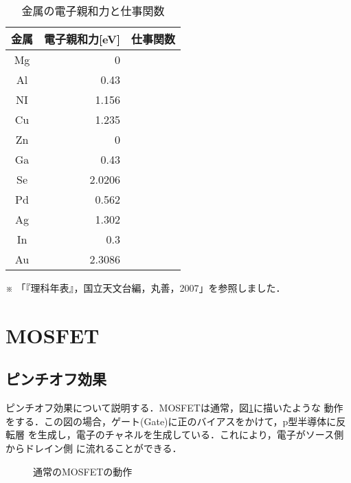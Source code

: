         \begin{table}[htbp]
            \caption{金属の電子親和力と仕事関数} \label{densin_sgotokansu}
            \begin{center}
                \begin{tabular}{|c|r|l|} \hline
                    金属 & \multicolumn{1}{c|}{電子親和力[eV]} & \multicolumn{1}{c|}{仕事関数} \\ \hline
                    Mg & 0\phantom{.}\phantom{0000} &  \\ \hline
                    Al & 0.43\phantom{00} &  \\ \hline
                    NI & 1.156\phantom{0} &  \\ \hline
                    Cu & 1.235\phantom{0} &  \\ \hline
                    Zn & 0\phantom{.}\phantom{0000} &  \\ \hline
                    Ga & 0.43\phantom{00} &  \\ \hline
                    Se & 2.0206 &  \\ \hline
                    Pd & 0.562\phantom{0} &  \\ \hline
                    Ag & 1.302\phantom{0} &  \\ \hline
                    In & 0.3\phantom{000} &  \\ \hline
                    Au & 2.3086 &  \\ \hline
                \end{tabular}
            \end{center}
        \end{table} %

    ※ 「『理科年表』，国立天文台編，丸善，2007」を参照しました．



    \section{MOSFET}
        \subsection{ピンチオフ効果}
        ピンチオフ効果について説明する．MOSFETは通常，図\ref{fig:MOSFET_1}に描いたような
        動作をする．この図の場合，ゲート(Gate)に正のバイアスをかけて，p型半導体に反転層
        を生成し，電子のチャネルを生成している．これにより，電子がソース側からドレイン側
        に流れることができる．
                    \begin{figure}[htbp]
                        \begin{center}
                            \caption{通常のMOSFETの動作}
                            \label{fig:MOSFET_1}
                        \end{center}
                    \end{figure}
